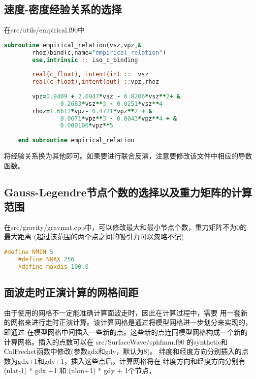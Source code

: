 \documentclass[10p,UTF8]{ctexart}
\begin{document}
    \subsection{速度-密度经验关系的选择}
    在src/utils/empirical.f90中 
    \begin{lstlisting}[language=fortran]
    subroutine empirical_relation(vsz,vpz,&
        rhoz)bind(c,name="empirical_relation")
        use,intrinsic :: iso_c_binding
      
        real(c_float), intent(in) ::  vsz
        real(c_float),intent(out) ::vpz,rhoz
      
        vpz=0.9409 + 2.0947*vsz - 0.8206*vsz**2+ &
                0.2683*vsz**3 - 0.0251*vsz**4
        rhoz=1.6612*vpz- 0.4721*vpz**2 + &
                0.0671*vpz**3 - 0.0043*vpz**4 + & 
                0.000106*vpz**5
      
    end subroutine empirical_relation
    \end{lstlisting}
    将经验关系换为其他即可。如果要进行联合反演，注意要修改该文件中相应的导数函数。

    \subsection{Gauss-Legendre节点个数的选择以及重力矩阵的计算范围}
    在src/gravity/gravmat.cpp中，可以修改最大和最小节点个数，重力矩阵不为0的最大距离
    (超过该范围的两个点之间的吸引力可以忽略不记)
    \begin{lstlisting}[language=c++]
    #define NMIN 5
    #define NMAX 256
    #define maxdis 100.0 
    \end{lstlisting}
    
    \subsection{面波走时正演计算的网格间距}
    由于使用的网格不一定能准确计算面波走时，因此在计算过程中，需要
    用一套新的网格来进行走时正演计算。该计算网格是通过将模型网格进一步划分来实现的，即通过
    在模型网格中间插入一些新的点。这些新的点连同模型网格构成一个新的计算网格。插入的点数可以在
    src/SurfaceWave/sphfmm.f90 的synthetic和CalFrechet函数中修改(参数gdx和gdy，默认为8)。
    纬度和经度方向分别插入的点数为gdx+1和gdy+1，插入这些点后，计算网格将在
    纬度方向和经度方向分别有(nlat-1) * gdx +1 和 (nlon+1) * gdy + 1个节点，
\end{document}
